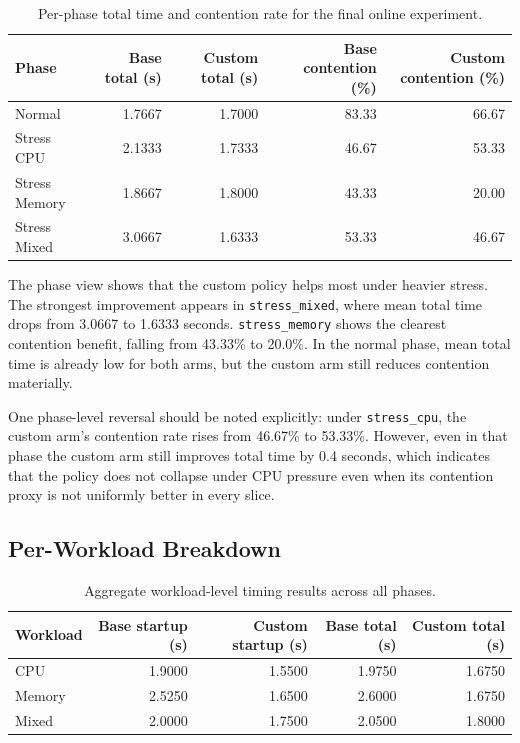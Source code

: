 \begin{table}[h]
\centering
\small
\begin{tabular}{lrrrr}
\hline
\textbf{Phase} & \textbf{Base total (s)} & \textbf{Custom total (s)} & \textbf{Base contention (\%)} & \textbf{Custom contention (\%)} \\
\hline
Normal & 1.7667 & 1.7000 & 83.33 & 66.67 \\
Stress CPU & 2.1333 & 1.7333 & 46.67 & 53.33 \\
Stress Memory & 1.8667 & 1.8000 & 43.33 & 20.00 \\
Stress Mixed & 3.0667 & 1.6333 & 53.33 & 46.67 \\
\hline
\end{tabular}
\caption{Per-phase total time and contention rate for the final online experiment.}
\label{tab:ch5-phase-results}
\end{table}

The phase view shows that the custom policy helps most under heavier stress. The strongest improvement appears in \texttt{stress\_mixed}, where mean total time drops from 3.0667 to 1.6333 seconds. \texttt{stress\_memory} shows the clearest contention benefit, falling from 43.33\% to 20.0\%. In the normal phase, mean total time is already low for both arms, but the custom arm still reduces contention materially.

One phase-level reversal should be noted explicitly: under \texttt{stress\_cpu}, the custom arm's contention rate rises from 46.67\% to 53.33\%. However, even in that phase the custom arm still improves total time by 0.4 seconds, which indicates that the policy does not collapse under CPU pressure even when its contention proxy is not uniformly better in every slice.


\subsection{Per-Workload Breakdown}

\begin{table}[h]
\centering
\small
\begin{tabular}{lrrrr}
\hline
\textbf{Workload} & \textbf{Base startup (s)} & \textbf{Custom startup (s)} & \textbf{Base total (s)} & \textbf{Custom total (s)} \\
\hline
CPU & 1.9000 & 1.5500 & 1.9750 & 1.6750 \\
Memory & 2.5250 & 1.6500 & 2.6000 & 1.6750 \\
Mixed & 2.0000 & 1.7500 & 2.0500 & 1.8000 \\
\hline
\end{tabular}
\caption{Aggregate workload-level timing results across all phases.}
\label{tab:ch5-workload-results}
\end{table}

